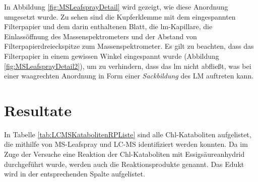 \documentclass[12pt,a4paper]{article}
\begin{document}
In Abbildung \ref{fig:MSLeafsprayDetail} wird gezeigt, wie diese Anordnung umgesetzt wurde. Zu sehen sind die Kupferklemme mit dem eingespannten Filterpapier und dem darin enthaltenen Blatt, die \gls{lm}-Kapillare, die Einlassöffnung des Massenspektrometers und der Abstand von Filterpapierdreieckspitze zum Massenspektrometer. Es gilt zu beachten, dass das Filterpapier in einem gewissen Winkel eingespannt wurde (Abbildung \ref{fig:MSLeafsprayDetail2}), um zu verhindern, dass das \gls{lm} nicht abfließt, was bei einer waagrechten Anordnung in Form einer \textit{Sackbildung} des LM auftreten kann.

\section{Resultate}

In Tabelle \ref{tab:LCMSKatabolitenRPListe} sind alle Chl-Kataboliten aufgelistet, die mithilfe von MS-Leafspray und LC-MS identifiziert werden konnten. Da im Zuge der Versuche eine Reaktion der Chl-Kataboliten mit Essigsäureanhydrid durchgeführt wurde, werden auch die Reaktionsprodukte genannt. Das Edukt wird in der entsprechenden Spalte aufgelistet.
\end{document}
